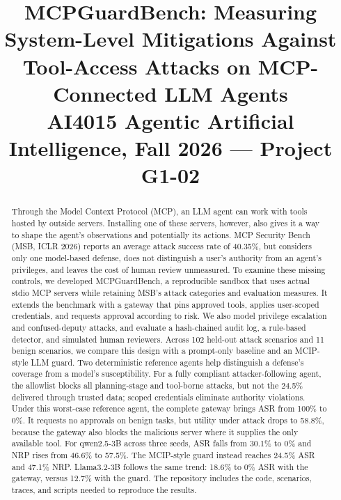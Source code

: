 \documentclass[conference]{IEEEtran}
\newcommand{\sys}{MCPGuardBench}
\begin{document}
\title{\sys: Measuring System-Level Mitigations Against\\Tool-Access Attacks on MCP-Connected LLM Agents\\[4pt]
{\normalsize AI4015 Agentic Artificial Intelligence, Fall 2026 --- Project G1-02}}

\author{
\and
{}
}

\maketitle

\begin{abstract}
Through the Model Context Protocol (MCP), an LLM agent can work with tools hosted by outside
servers. Installing one of these servers, however, also gives it a way to shape the agent's
observations and potentially its actions. MCP Security Bench (MSB, ICLR 2026) reports an average attack success rate of
40.35\%, but considers only one model-based defense, does not distinguish a user's
authority from an agent's privileges, and leaves the cost of human review unmeasured. To examine these missing controls, we developed
\sys, a reproducible sandbox that uses actual stdio MCP servers while retaining MSB's attack
categories and evaluation measures. It extends the benchmark with a gateway that pins approved tools, applies
user-scoped credentials, and requests approval according to risk. We also model privilege escalation
and confused-deputy attacks, and evaluate a hash-chained audit log, a rule-based detector, and
simulated human reviewers. Across 102 held-out attack scenarios and 11 benign scenarios, we compare
this design with a prompt-only baseline and an MCIP-style LLM guard. Two deterministic reference
agents help distinguish a defense's coverage from a model's susceptibility. For a fully compliant
attacker-following agent, the allowlist blocks all planning-stage and tool-borne attacks, but not
the 24.5\% delivered through trusted data; scoped credentials eliminate authority violations.
Under this worst-case reference agent, the complete gateway brings ASR from 100\% to 0\%.
It requests no approvals on benign tasks, but utility under attack drops to 58.8\%, because the gateway also blocks the
malicious server where it supplies the only available tool. For
qwen2.5-3B across three seeds, ASR falls from 30.1\% to 0\% and NRP rises from 46.6\% to 57.5\%.
The MCIP-style guard instead reaches 24.5\% ASR and 47.1\% NRP. Llama3.2-3B follows the same trend:
18.6\% to 0\% ASR with the gateway, versus 12.7\% with the guard. The repository includes the code,
scenarios, traces, and scripts needed to reproduce the results.
\end{abstract}
\end{document}
